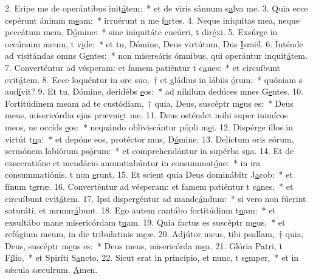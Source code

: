 2. Eripe me de operántibus init\uline{á}tem:~* et de viris sánnum s\uline{a}lva me.
3. Quia ecce cepérunt ánimm m\uline{e}am:~* irruérunt n me f\uline{o}rtes.
4. Neque iníquitas mea, neque peccátum mem, D\uline{ó}mine:~* sine iniquitáte cucúrri, t dir\uline{é}xi.
5. Exsúrge in occúrsum meum, t v\uline{i}de:~* et tu, Dómine, Deus virtútum, Dus \uline{I}sraël.
6. Inténde ad visitándas omns G\uline{e}ntes:~* non misereáris ómnibus, qui operántur inquit\uline{á}tem.
7. Converténtur ad vésperam: et famem patiéntur t c\uline{a}nes:~* et circuíbunt cvit\uline{á}tem.
8. Ecce loquéntur in ore suo,~† et gládius in lábiis \uline{ó}rum:~* quóniam s aud\uline{í}vit?
9. Et tu, Dómine, deridébs \uline{e}os:~* ad níhilum dedúces mnes G\uline{e}ntes.
10. Fortitúdinem meam ad te custódiam,~† quia, Deus, suscéptr m\uline{e}us es:~* Deus meus, misericórdia ejus prævni\uline{e}t me.
11. Deus osténdet mihi super inimícos meos, ne occíds \uline{e}os:~* nequándo obliviscántur pópli m\uline{e}i.
12. Dispérge illos in virtút t\uline{u}a:~* et depóne eos, protéctor mus, D\uline{ó}mine:
13. Delíctum oris eórum, sermónem labiórum ps\uline{ó}rum:~* et comprehendántur in supérba s\uline{u}a.
14. Et de exsecratióne et mendácio annuntiabúntur in consummat\uline{ó}ne:~* in ira consummatiónis, t non \uline{e}runt.
15. Et scient quia Deus dominábitr J\uline{a}cob:~* et fínum t\uline{e}rræ.
16. Converténtur ad vésperam: et famem patiéntur t c\uline{a}nes,~* et circuíbunt cvit\uline{á}tem.
17. Ipsi dispergéntur ad mandc\uline{á}ndum:~* si vero non fúerint saturáti, et mrmur\uline{á}bunt.
18. Ego autem cantábo fortitúdinm t\uline{u}am:~* et exsultábo mane misericórdam t\uline{u}am.
19. Quia factus es suscéptr m\uline{e}us,~* et refúgium meum, in die tribulatinis m\uline{e}æ.
20. Adjútor meus, tibi psallam,~† quia, Deus, suscéptr m\uline{e}us es:~* Deus meus, misericórda m\uline{e}a.
21. Glória Patri, t F\uline{í}lio,~* et Spiríti S\uline{a}ncto.
22. Sicut erat in princípio, et nunc, t s\uline{e}mper,~* et in sǽcula sæculrum. \uline{A}men.
